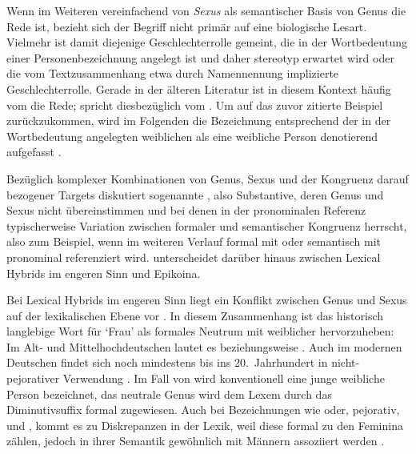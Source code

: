 Wenn im Weiteren vereinfachend von \textit{Sexus} als semantischer Basis von
Genus die Rede ist, bezieht sich der Begriff nicht primär auf eine
biologische Lesart. Vielmehr ist damit diejenige
Geschlechter\-rolle gemeint, die in der Wortbedeutung
einer Personenbezeichnung angelegt ist und daher stereotyp erwartet wird oder
die vom Textzusammenhang etwa durch Namennennung implizierte
Geschlechterrolle. Gerade in der älteren Literatur ist in
diesem Kontext häufig vom  die Rede;
\citet[67]{panther2009} spricht diesbezüglich vom
. Um auf das zuvor zitierte Beispiel zurückzukommen,
wird im Folgenden die Bezeichnung  entsprechend der in der
Wortbedeutung angelegten weiblichen  als eine weibliche
Person denotierend aufgefasst
\autocite[vgl.][s.\,v.~]{duden-online}.


Bezüglich komplexer Kombinationen von Genus, Sexus und der Kongruenz darauf
bezogener Targets diskutiert \citet[183--184]{corbett1991} sogenannte
, also Substantive, deren Genus und Sexus nicht
übereinstimmen und bei denen in der pronominalen Referenz typischerweise
Variation zwischen formaler und semantischer Kongruenz herrscht, also zum
Beispiel, wenn  im weiteren Verlauf formal mit  oder
semantisch mit  pronominal referenziert wird. \citet{klein2022}
unterscheidet darüber hinaus zwischen Lexical Hybrids im engeren Sinn und
Epikoina.

Bei Lexical Hybrids im engeren Sinn liegt ein Konflikt zwischen Genus und Sexus
auf der lexikalischen Ebene vor \autocite[145]{klein2022}. In diesem
Zusammenhang ist das historisch langlebige Wort für `Frau' als
formales Neutrum mit weiblicher  hervorzuheben: Im Alt- und
Mittelhochdeutschen lautet es  beziehungsweise
. Auch im modernen Deutschen findet sich 
noch mindestens bis ins 20.~Jahrhundert in nicht-pejorativer Verwendung
\autocite[166]{fleischer2012}. Im Fall von  wird konventionell eine
junge weibliche Person bezeichnet, das neutrale Genus wird dem Lexem durch das
Diminutivsuffix  formal zugewiesen. Auch bei Bezeichnungen wie
 oder, pejorativ,  und , kommt es zu
Diskrepanzen in der Lexik, weil diese formal zu den Feminina zählen, jedoch in
ihrer Semantik gewöhnlich mit Männern assoziiert werden
\autocite[vgl.~auch][67--68]{panther2009}.

